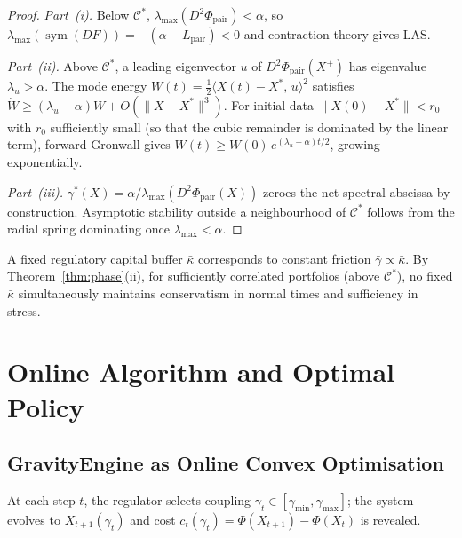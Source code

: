 \documentclass[final]{siamltex}
\newcommand{\norm}[1]{\lVert #1 \rVert}
\newcommand{\inner}[2]{\langle #1,\, #2 \rangle}
\newcommand{\Cman}{\mathcal{C}^*}
\newcommand{\Xst}{X^*}
\newcommand{\Lpair}{L_{\mathrm{pair}}}
\newcommand{\lmax}{\lambda_{\max}}
\DeclareMathOperator{\sym}{sym}
\begin{document}
\begin{proof}
\textit{Part~(i).} Below $\Cman$,
$\lmax(D^2\Phi_{\mathrm{pair}})<\alpha$, so
$\lmax(\sym(DF))=-(\alpha-\Lpair)<0$ and contraction theory
\cite{lohmiller1998contraction} gives LAS.

\textit{Part~(ii).} Above $\Cman$, a leading eigenvector $u$ of
$D^2\Phi_{\mathrm{pair}}(X^+)$ has eigenvalue
$\lambda_u>\alpha$. The mode energy
$W(t)=\frac{1}{2}\inner{X(t){-}\Xst}{u}^2$ satisfies
$\dot{W}\ge(\lambda_u{-}\alpha)W + O(\norm{X{-}\Xst}^3)$.
For initial data $\norm{X(0){-}\Xst} < r_0$ with $r_0$
sufficiently small (so that the cubic remainder is dominated
by the linear term), forward Gronwall gives
$W(t) \ge W(0)\,e^{(\lambda_u{-}\alpha)t/2}$,
growing exponentially.

\textit{Part~(iii).}
$\gamma^*(X)=\alpha/\lmax(D^2\Phi_{\mathrm{pair}}(X))$ zeroes the
net spectral abscissa by construction. Asymptotic stability outside
a neighbourhood of $\Cman$ follows from the radial spring
dominating once $\lmax<\alpha$.
\end{proof}

\begin{corollary}\label{cor:procyclical}
A fixed regulatory capital buffer $\bar{\kappa}$ \cite{basel2010} corresponds to
constant friction $\bar{\gamma}\propto\bar{\kappa}$. By
Theorem~\ref{thm:phase}(ii), for sufficiently correlated
portfolios (above $\Cman$), no fixed $\bar{\kappa}$ simultaneously
maintains conservatism in normal times and sufficiency in stress.
\end{corollary}


\section{Online Algorithm and Optimal Policy}\label{sec:online}

\subsection{GravityEngine as Online Convex Optimisation}

At each step $t$, the regulator selects coupling
$\gamma_t\in[\gamma_{\min},\gamma_{\max}]$; the system evolves to
$X_{t+1}(\gamma_t)$ and cost
$c_t(\gamma_t)=\Phi(X_{t+1})-\Phi(X_t)$ is revealed.
\end{document}

